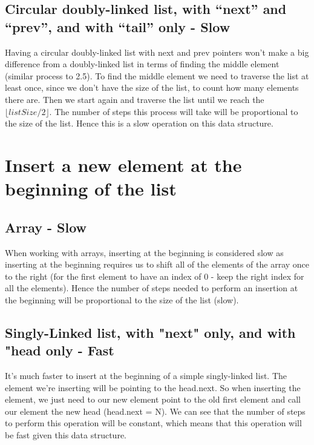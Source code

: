 \documentclass{article}
\begin{document}
\subsection{Circular doubly-linked list, with “next” and “prev”, and with “tail” only - Slow}
Having a circular doubly-linked list with next and prev pointers won't make a big difference from a doubly-linked list in terms of finding the middle element (similar process to 2.5). To find the middle element we need to traverse the list at least once, since we don't have the size of the list, to count how many elements there are. Then we start again and traverse the list until we reach the $\lfloor {listSize/2} \rfloor$. The number of steps this process will take will be proportional to the size of the list. Hence this is a slow operation on this data structure.



\section{Insert a new element at the beginning of the list}


\subsection{Array - Slow}
When working with arrays, inserting at the beginning is considered slow as inserting at the beginning requires us to shift all of the elements of the array once to the right (for the first element to have an index of 0 - keep the right index for all the elements). Hence the number of steps needed to perform an insertion at the beginning will be proportional to the size of the list (slow).

\subsection{Singly-Linked list, with "next" only, and with "head only - Fast}
It's much faster to insert at the beginning of a simple singly-linked list. The element we're inserting will be pointing to the head.next. So when inserting the element, we just need to our new element point to the old first element and call our element the new head (head.next = N). We can see that the number of steps to perform this operation will be constant, which means that this operation will be fast given this data structure. 
\end{document}
